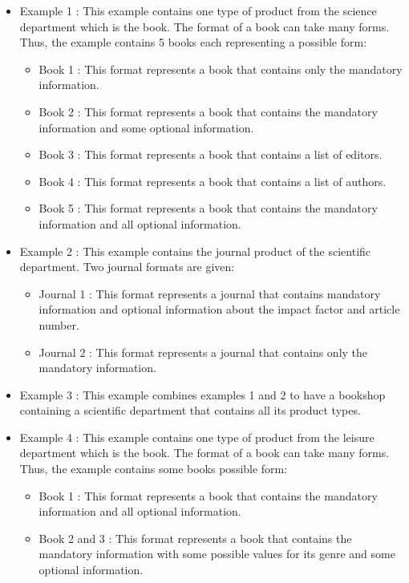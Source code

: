 \documentclass{article}
\begin{document}
\begin{itemize}
    \item Example 1 : This example contains one type of product from the science department which is the book. The format of a book can take many forms. Thus, the example contains 5 books each representing a possible form:
    \begin{itemize}
        \item Book 1 : This format represents a book that contains only the mandatory information.
        \item Book 2 : This format represents a book that contains the mandatory information and some optional information.
        \item Book 3 : This format represents a book that contains a list of editors.
        \item Book 4 : This format represents a book that contains a list of authors.
        \item Book 5 : This format represents a book that contains the mandatory information and all optional information.
    \end{itemize}
    \item Example 2 : This example contains the journal product of the scientific department. Two journal formats are given:
    \begin{itemize}
        \item Journal 1 : This format represents a journal that contains mandatory information and optional information about the impact factor and article number.
        \item Journal 2 : This format represents a journal that contains only the mandatory information.
    \end{itemize}
    \item Example 3 : This example combines examples 1 and 2 to have a bookshop containing a scientific department that contains all its product types.
    \item Example 4 : This example contains one type of product from the leisure department which is the book. The format of a book can take many forms. Thus, the example contains some books possible form:
    \begin{itemize}
        \item Book 1 : This format represents a book that contains the mandatory information and all optional information.
        \item Book 2 and 3 : This format represents a book that contains the mandatory information with some possible values for its genre and some optional information.

\end{itemize}
\end{itemize}
\end{document}
